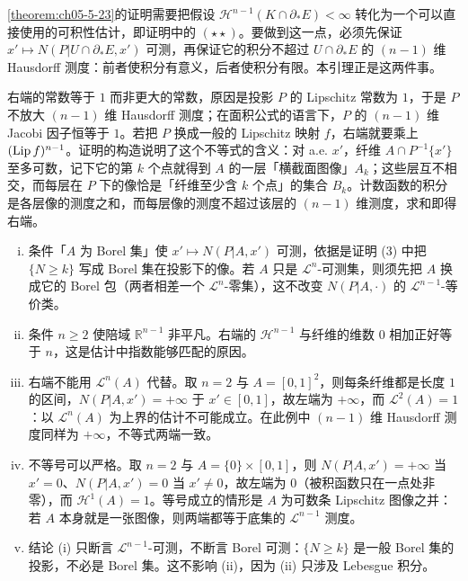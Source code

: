 \documentclass[../../main.tex]{subfiles}%
\begin{document}
\begin{remark}\label{remark:ch05-lem-5-8-动机}
\cref{theorem:ch05-5-23}的证明需要把假设 $\mathcal{H}^{n-1}(K\cap\partial_*E)<\infty$ 转化为一个可以直接使用的可积性估计，即证明中的 $(\star\star)$。要做到这一点，必须先保证 $x'\mapsto N(P|U\cap\partial_*E,x')$ 可测，再保证它的积分不超过 $U\cap\partial_*E$ 的 $(n-1)$ 维 Hausdorff 测度：前者使积分有意义，后者使积分有限。本引理正是这两件事。%

右端的常数等于 $1$ 而非更大的常数，原因是投影 $P$ 的 Lipschitz 常数为 $1$，于是 $P$ 不放大 $(n-1)$ 维 Hausdorff 测度；在面积公式的语言下，$P$ 的 $(n-1)$ 维 Jacobi 因子恒等于 $1$。若把 $P$ 换成一般的 Lipschitz 映射 $f$，右端就要乘上 $(\operatorname{Lip} f)^{n-1}$。证明的构造说明了这个不等式的含义：对 a.e. $x'$，纤维 $A\cap P^{-1}\{x'\}$ 至多可数，记下它的第 $k$ 个点就得到 $A$ 的一层「横截面图像」$A_k$；这些层互不相交，而每层在 $P$ 下的像恰是「纤维至少含 $k$ 个点」的集合 $B_k$。计数函数的积分是各层像的测度之和，而每层像的测度不超过该层的 $(n-1)$ 维测度，求和即得右端。
\end{remark}

\begin{remark}\label{remark:ch05-lem-5-8-条件}
\begin{enumerate}[(i)]
\item 条件「$A$ 为 Borel 集」使 $x'\mapsto N(P|A,x')$ 可测，依据是证明 (3) 中把 $\{N\geqslant k\}$ 写成 Borel 集在投影下的像。若 $A$ 只是 $\mathcal{L}^n$-可测集，则须先把 $A$ 换成它的 Borel 包（两者相差一个 $\mathcal{L}^n$-零集），这不改变 $N(P|A,\cdot)$ 的 $\mathcal{L}^{n-1}$-等价类。
\item 条件 $n\geqslant2$ 使陪域 $\mathbb{R}^{n-1}$ 非平凡。右端的 $\mathcal{H}^{n-1}$ 与纤维的维数 $0$ 相加正好等于 $n$，这是估计中指数能够匹配的原因。
\item 右端不能用 $\mathcal{L}^n(A)$ 代替。取 $n=2$ 与 $A=[0,1]^2$，则每条纤维都是长度 $1$ 的区间，$N(P|A,x')=+\infty$ 于 $x'\in[0,1]$，故左端为 $+\infty$，而 $\mathcal{L}^2(A)=1$：以 $\mathcal{L}^n(A)$ 为上界的估计不可能成立。在此例中 $(n-1)$ 维 Hausdorff 测度同样为 $+\infty$，不等式两端一致。
\item 不等号可以严格。取 $n=2$ 与 $A=\{0\}\times[0,1]$，则 $N(P|A,x')=+\infty$ 当 $x'=0$、$N(P|A,x')=0$ 当 $x'\neq0$，故左端为 $0$（被积函数只在一点处非零），而 $\mathcal{H}^1(A)=1$。等号成立的情形是 $A$ 为可数条 Lipschitz 图像之并：若 $A$ 本身就是一张图像，则两端都等于底集的 $\mathcal{L}^{n-1}$ 测度。
\item 结论 (i) 只断言 $\mathcal{L}^{n-1}$-可测，不断言 Borel 可测：$\{N\geqslant k\}$ 是一般 Borel 集的投影，不必是 Borel 集。这不影响 (ii)，因为 (ii) 只涉及 Lebesgue 积分。
\end{enumerate}
\end{remark}
\end{document}
